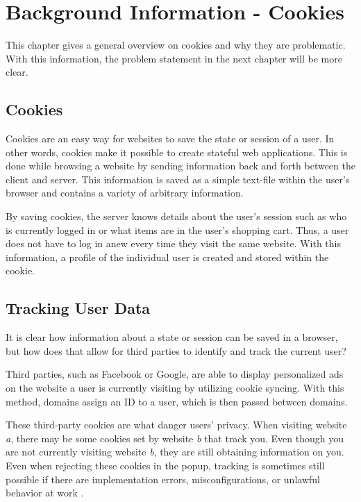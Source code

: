 \chapter{Background Information - Cookies}
\label{ch:bg_cookies}
This chapter gives a general overview on cookies and why they are problematic. With this information, the problem statement in the next chapter will be more clear.


%
%
\section{Cookies}
\label{sec:bg_cookies:cookies}
Cookies are an easy way for websites to save the state or session of a user. In other words, cookies make it possible to create stateful web applications. This is done while browsing a website by sending information back and forth between the client and server. This information is saved as a simple text-file within the user's browser and contains a variety of arbitrary information. \cite{cookies1}

By saving cookies, the server knows details about the user's session such as who is currently logged in or what items are in the user's shopping cart. Thus, a user does not have to log in anew every time they visit the same website. With this information, a profile of the individual user is created and stored within the cookie. \cite{cookies1}



%
%
\section{Tracking User Data}
\label{sec:bg_cookies:data}
It is clear how information about a state or session can be saved in a browser, but how does that allow for third parties to identify and track the current user?

Third parties, such as Facebook or Google, are able to display personalized ads on the website a user is currently visiting by utilizing cookie syncing. With this method, domains assign an ID to a user, which is then passed between domains. \cite{cookies2}

These third-party cookies are what danger users' privacy. When visiting website \textit{a}, there may be some cookies set by website \textit{b} that track you. Even though you are not currently visiting website \textit{b}, they are still obtaining information on you. Even when rejecting these cookies in the popup, tracking is sometimes still possible if there are implementation errors, misconfigurations, or unlawful behavior at work \cite{thirdPartyCookies}.

